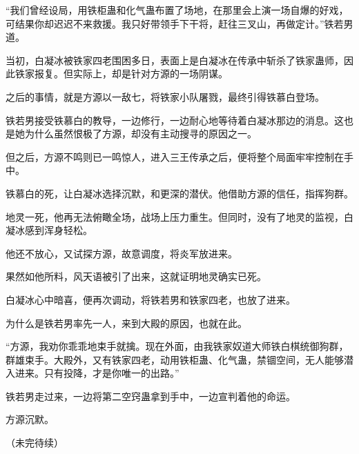 \begin{this_body}
“我们曾经设局，用铁柜蛊和化气蛊布置了场地，在那里会上演一场自爆的好戏，可结果你却迟迟不来救援。我只好带领手下干将，赶往三叉山，再做定计。”铁若男道。

当初，白凝冰被铁家四老围困多日，表面上是白凝冰在传承中斩杀了铁家蛊师，因此铁家报复。但实际上，却是针对方源的一场阴谋。

之后的事情，就是方源以一敌七，将铁家小队屠戮，最终引得铁慕白登场。

铁若男接受铁慕白的教导，一边修行，一边耐心地等待着白凝冰那边的消息。这也是她为什么虽然恨极了方源，却没有主动搜寻的原因之一。

但之后，方源不鸣则已一鸣惊人，进入三王传承之后，便将整个局面牢牢控制在手中。

铁慕白的死，让白凝冰选择沉默，和更深的潜伏。他借助方源的信任，指挥狗群。

地灵一死，他再无法俯瞰全场，战场上压力重生。但同时，没有了地灵的监视，白凝冰感到浑身轻松。

他还不放心，又试探方源，故意调度，将炎军放进来。

果然如他所料，风天语被引了出来，这就证明地灵确实已死。

白凝冰心中暗喜，便再次调动，将铁若男和铁家四老，也放了进来。

为什么是铁若男率先一人，来到大殿的原因，也就在此。

“方源，我劝你乖乖地束手就擒。现在外面，由我铁家奴道大师铁白棋统御狗群，群雄束手。大殿外，又有铁家四老，动用铁柜蛊、化气蛊，禁锢空间，无人能够潜入进来。只有投降，才是你唯一的出路。”

铁若男走过来，一边将第二空窍蛊拿到手中，一边宣判着他的命运。

方源沉默。

（未完待续）

\end{this_body}

